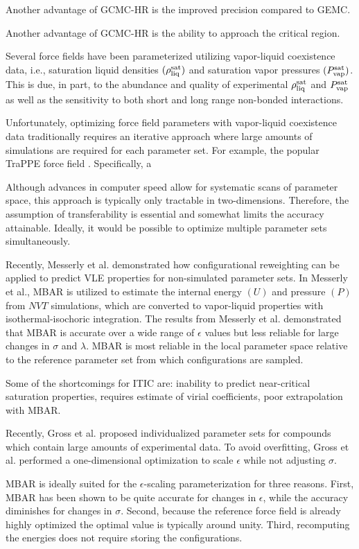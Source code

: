 \documentclass[11pt,a4paper]{article}
\begin{document}
Another advantage of GCMC-HR is the improved precision compared to GEMC.

Another advantage of GCMC-HR is the ability to approach the critical region.

Several force fields have been parameterized utilizing vapor-liquid coexistence data, i.e., saturation liquid densities $(\rho_{\rm liq}^{\rm sat})$ and saturation vapor pressures $(P_{\rm vap}^{\rm sat})$. This is due, in part, to the abundance and quality of experimental $\rho_{\rm liq}^{\rm sat}$ and $P_{\rm vap}^{\rm sat}$ as well as the sensitivity to both short and long range non-bonded interactions.

Unfortunately, optimizing force field parameters with vapor-liquid coexistence data traditionally requires an iterative approach where large amounts of simulations are required for each parameter set. For example, the popular TraPPE force field . Specifically, a 

Although advances in computer speed allow for systematic scans of parameter space, this approach is typically only tractable in two-dimensions. Therefore, the assumption of transferability is essential and somewhat limits the accuracy attainable. Ideally, it would be possible to optimize multiple parameter sets simultaneously.

Recently, Messerly et al. demonstrated how configurational reweighting can be applied to predict VLE properties for non-simulated parameter sets. In Messerly et al., MBAR is utilized to estimate the internal energy $(U)$ and pressure $(P)$ from $NVT$ simulations, which are converted to vapor-liquid properties with isothermal-isochoric integration. The results from Messerly et al. demonstrated that MBAR is accurate over a wide range of $\epsilon$ values but less reliable for large changes in $\sigma$ and $\lambda$. MBAR is most reliable in the local parameter space relative to the reference parameter set from which configurations are sampled.

Some of the shortcomings for ITIC are: inability to predict near-critical saturation properties, requires estimate of virial coefficients, poor extrapolation with MBAR.

Recently, Gross et al. proposed individualized parameter sets for compounds which contain large amounts of experimental data. To avoid overfitting, Gross et al. performed a one-dimensional optimization to scale $\epsilon$ while not adjusting $\sigma$. 

MBAR is ideally suited for the $\epsilon$-scaling parameterization for three reasons. First, MBAR has been shown to be quite accurate for changes in $\epsilon$, while the accuracy diminishes for changes in $\sigma$. Second, because the reference force field is already highly optimized the optimal value is typically around unity. Third, recomputing the energies does not require storing the configurations.
\end{document}
